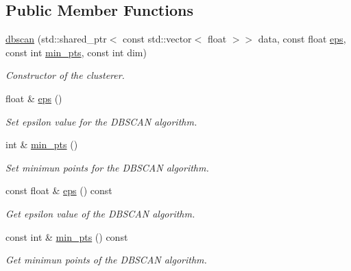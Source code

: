 \subsection*{Public Member Functions}
\begin{DoxyCompactItemize}
\item 
\hyperlink{classcluster_1_1dbscan_af77dacb349da6976a3521297a6b50d0d}{dbscan} (std\+::shared\+\_\+ptr$<$ const std\+::vector$<$ float $>$$>$ data, const float \hyperlink{classcluster_1_1dbscan_adffe3dee8aede13ce2068552a38e4bb9}{eps}, const int \hyperlink{classcluster_1_1dbscan_a5f424fb02ca1d736fb07f9e214a01a65}{min\+\_\+pts}, const int dim)
\begin{DoxyCompactList}\small\item\em Constructor of the clusterer. \end{DoxyCompactList}\item 
\hypertarget{classcluster_1_1dbscan_adffe3dee8aede13ce2068552a38e4bb9}{}float \& \hyperlink{classcluster_1_1dbscan_adffe3dee8aede13ce2068552a38e4bb9}{eps} ()\label{classcluster_1_1dbscan_adffe3dee8aede13ce2068552a38e4bb9}

\begin{DoxyCompactList}\small\item\em Set epsilon value for the D\+B\+S\+C\+A\+N algorithm. \end{DoxyCompactList}\item 
\hypertarget{classcluster_1_1dbscan_a5f424fb02ca1d736fb07f9e214a01a65}{}int \& \hyperlink{classcluster_1_1dbscan_a5f424fb02ca1d736fb07f9e214a01a65}{min\+\_\+pts} ()\label{classcluster_1_1dbscan_a5f424fb02ca1d736fb07f9e214a01a65}

\begin{DoxyCompactList}\small\item\em Set minimun points for the D\+B\+S\+C\+A\+N algorithm. \end{DoxyCompactList}\item 
\hypertarget{classcluster_1_1dbscan_a16f0b7f5ffa65a6638df01554559ba29}{}const float \& \hyperlink{classcluster_1_1dbscan_a16f0b7f5ffa65a6638df01554559ba29}{eps} () const \label{classcluster_1_1dbscan_a16f0b7f5ffa65a6638df01554559ba29}

\begin{DoxyCompactList}\small\item\em Get epsilon value of the D\+B\+S\+C\+A\+N algorithm. \end{DoxyCompactList}\item 
\hypertarget{classcluster_1_1dbscan_a099428308e3dd233ad0098bf85fdbb7b}{}const int \& \hyperlink{classcluster_1_1dbscan_a099428308e3dd233ad0098bf85fdbb7b}{min\+\_\+pts} () const \label{classcluster_1_1dbscan_a099428308e3dd233ad0098bf85fdbb7b}

\begin{DoxyCompactList}\small\item\em Get minimun points of the D\+B\+S\+C\+A\+N algorithm. \end{DoxyCompactList}\end{DoxyCompactItemize}
